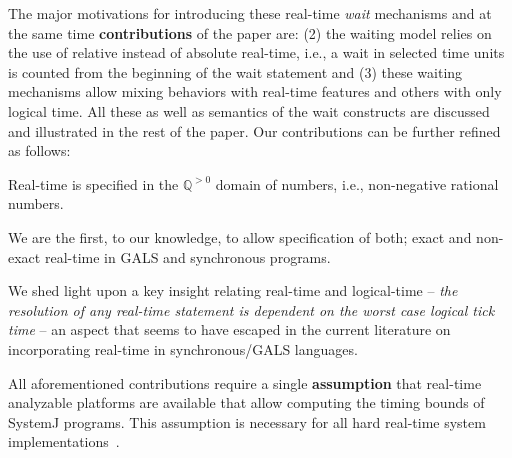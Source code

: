 

The major motivations for introducing these real-time \textit{wait}
mechanisms and at the same time \textbf{contributions} of the paper are:
 (2) the waiting
model relies on the use of relative instead of absolute real-time, i.e.,
a wait in selected time units is counted from the beginning of the wait
statement and (3) these waiting mechanisms allow mixing behaviors with
real-time features and others with only logical time. All these as well
as semantics of the wait constructs are discussed and illustrated in the
rest of the paper. Our contributions can be further refined as follows:

\begin{enumerate*}
\item Real-time is specified in the $\mathbb{Q}^{>0}$ domain of numbers,
  i.e., non-negative rational numbers.
\item We are the first, to our knowledge, to allow specification of
  both; exact and non-exact real-time in GALS and synchronous programs.
\item We shed light upon a key insight relating real-time and
  logical-time -- \textit{the resolution of any real-time statement is
    dependent on the worst case logical tick time} -- an aspect that
  seems to have escaped in the current literature on incorporating
  real-time in synchronous/GALS languages.
\end{enumerate*}

All aforementioned contributions require a single \textbf{assumption}
that real-time analyzable platforms are available that allow computing
the timing bounds of SystemJ programs. This assumption is necessary for
all hard real-time system implementations~\cite{wilhelm08}.


